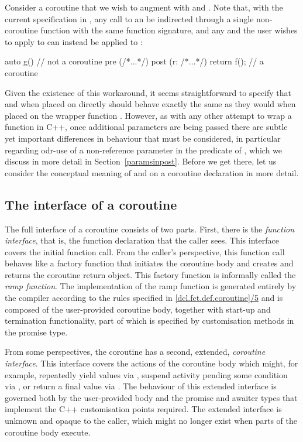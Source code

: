 Consider a coroutine  that we wish to augment with  and . Note that, with the current specification in \cite{P2900R8}, any call to  an be indirected through a single non-coroutine function  with the same function signature, and any  and  the user wishes to apply to  can instead be applied to :
\begin{codeblock}
auto g()  // not a coroutine
  pre (/*...*/) 
  post (r: /*...*/) { 
  return f();  // a coroutine
} 
\end{codeblock}
Given the existence of this workaround, it seems straightforward to specify that  and  when placed on   directly should behave exactly the same  as they would when placed on the wrapper function . However, as with any other attempt to wrap a function in C++, once additional parameters are being passed there are subtle yet important differences in behaviour that must be considered, in particular regarding odr-use of a non-reference parameter in the predicate of , which we discuss in more detail in Section~\ref{paramsinpost}. Before we get there, let us consider the conceptual meaning of  and  on a coroutine declaration in more detail.

\subsection{The interface of a coroutine}

The full interface of a coroutine consists of two parts. First, there is the \emph{function interface}, that is, the function declaration that the caller sees. This interface covers the initial function call. From the caller's perspective, this function call behaves like a factory function that initiates the coroutine body and creates and returns the coroutine return object. This factory function is informally called the \emph{ramp function}. The implementation of the ramp function is generated entirely by the compiler according to the rules specified in \href{https://eel.is/c++draft/dcl.fct.def.coroutine#5}{[dcl.fct.def.coroutine]/5} and is composed of the user-provided coroutine body, together with start-up and termination functionality, part of which is specified by customisation methods in the promise type.

From some perspectives, the coroutine has a second, extended, \emph{coroutine interface}. This interface covers the actions of the coroutine body which might, for example, repeatedly yield values via , suspend activity pending some condition via , or return a final value via .  The behaviour of this extended interface is governed both by the user-provided body and the promise and awaiter types that implement the C++ customisation points required. The extended interface is unknown and opaque to the caller, which might no longer exist when parts of the coroutine body execute.

